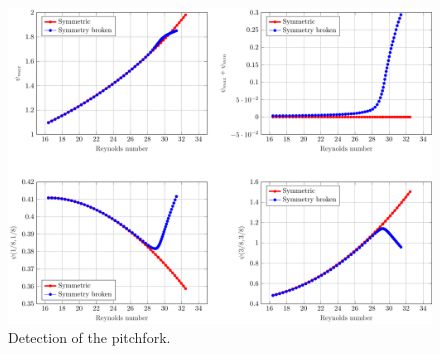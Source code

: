 \begin{figure}[h!]
    \centering
    \caption{Detection of the pitchfork.}
    \label{fig:pitch_detection}
    \centerline{\includegraphics[width=1\textwidth]{images/pitch_detection.pdf}}
\end{figure}

